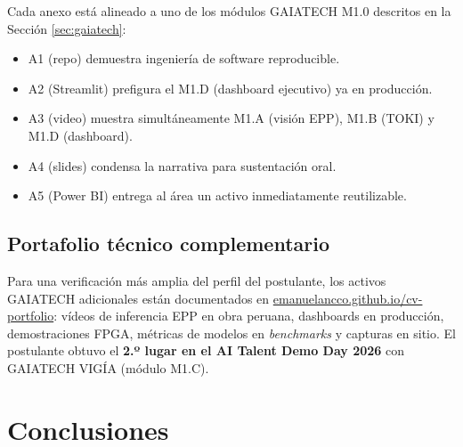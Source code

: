 \documentclass[12pt,a4paper]{article}
\begin{document}
Cada anexo está alineado a uno de los módulos GAIATECH M1.0 descritos en la Sección \ref{sec:gaiatech}:
\begin{itemize}\setlength\itemsep{1pt}
\item A1 (repo) demuestra ingeniería de software reproducible.
\item A2 (Streamlit) prefigura el M1.D (dashboard ejecutivo) ya en producción.
\item A3 (video) muestra simultáneamente M1.A (visión EPP), M1.B (TOKI) y M1.D (dashboard).
\item A4 (slides) condensa la narrativa para sustentación oral.
\item A5 (Power BI) entrega al área un activo inmediatamente reutilizable.
\end{itemize}

\subsection*{Portafolio técnico complementario}

Para una verificación más amplia del perfil del postulante, los activos GAIATECH adicionales están documentados en \href{https://emanuelancco.github.io/cv-portfolio/}{emanuelancco.github.io/cv-portfolio}: vídeos de inferencia EPP en obra peruana, dashboards en producción, demostraciones FPGA, métricas de modelos en \emph{benchmarks} y capturas en sitio. El postulante obtuvo el \textbf{2.º lugar en el AI Talent Demo Day 2026} con GAIATECH VIGÍA (módulo M1.C).

\section{Conclusiones}
\end{document}
